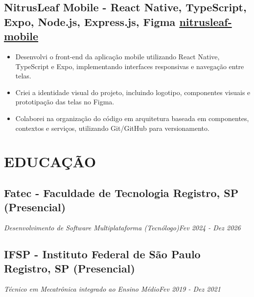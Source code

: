 \documentclass[a4paper,10pt]{article}
\begin{document}
    \subsection*{\textbf{NitrusLeaf Mobile - React Native, TypeScript, Expo, Node.js, Express.js, Figma} \hfill \href{https://github.com/Vitalliz/nitrusleaf-mobile}{nitrusleaf-mobile}}  
        \begin{itemize} 
            \item Desenvolvi o front-end da aplicação mobile utilizando React Native, TypeScript e Expo, implementando interfaces responsivas e navegação entre telas.
            \item Criei a identidade visual do projeto, incluindo logotipo, componentes visuais e prototipação das telas no Figma.
            \item Colaborei na organização do código em arquitetura baseada em componentes, contextos e serviços, utilizando Git/GitHub para versionamento.
        
        
        \end{itemize}

\section{EDUCAÇÃO}
    \subsection*{\texorpdfstring{
            \textbf{Fatec - Faculdade de Tecnologia} \hfill Registro, SP (Presencial)
        }{
            Fatec Registro (Educação) -- Localização
        }}
    \textit{Desenvolvimento de Software Multiplataforma (Tecnólogo)\hfill Fev 2024 - Dez 2026}

    \subsection*{\texorpdfstring{
            \textbf{IFSP - Instituto Federal de São Paulo} \hfill Registro, SP (Presencial)
        }{
            IFSP Registro (Educação) -- Localização
        }}
    \textit{Técnico em Mecatrônica integrado ao Ensino Médio\hfill Fev 2019 - Dez 2021}
\end{document}
